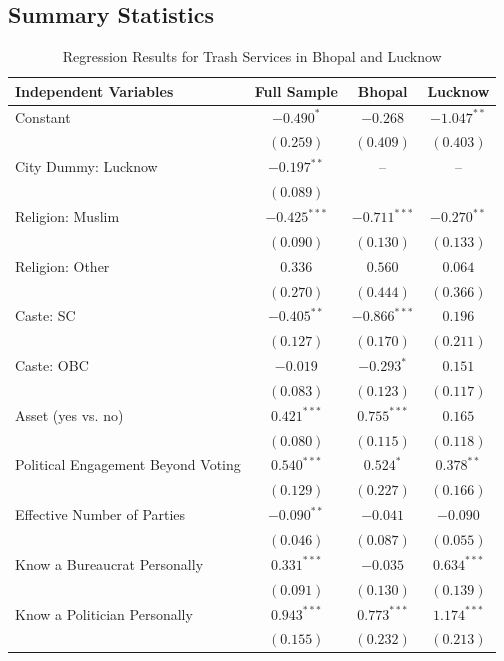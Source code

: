\subsection{Summary Statistics}

\begin{table}[htbp]
\centering
\caption{Regression Results for Trash Services in Bhopal and Lucknow}
\label{tab:trash_regression}
\small
\begin{tabular}{lccc}
\hline\hline
\textbf{Independent Variables} & \textbf{Full Sample} & \textbf{Bhopal} & \textbf{Lucknow} \\
\hline
Constant & $-0.490^{*}$ & $-0.268$ & $-1.047^{**}$ \\
 & $(0.259)$ & $(0.409)$ & $(0.403)$ \\
City Dummy: Lucknow & $-0.197^{**}$ & -- & -- \\
 & $(0.089)$ & & \\
Religion: Muslim & $-0.425^{***}$ & $-0.711^{***}$ & $-0.270^{**}$ \\
 & $(0.090)$ & $(0.130)$ & $(0.133)$ \\
Religion: Other & $0.336$ & $0.560$ & $0.064$ \\
 & $(0.270)$ & $(0.444)$ & $(0.366)$ \\
Caste: SC & $-0.405^{**}$ & $-0.866^{***}$ & $0.196$ \\
 & $(0.127)$ & $(0.170)$ & $(0.211)$ \\
Caste: OBC & $-0.019$ & $-0.293^{*}$ & $0.151$ \\
 & $(0.083)$ & $(0.123)$ & $(0.117)$ \\
Asset (yes vs. no) & $0.421^{***}$ & $0.755^{***}$ & $0.165$ \\
 & $(0.080)$ & $(0.115)$ & $(0.118)$ \\
Political Engagement Beyond Voting & $0.540^{***}$ & $0.524^{*}$ & $0.378^{**}$ \\
 & $(0.129)$ & $(0.227)$ & $(0.166)$ \\
Effective Number of Parties & $-0.090^{**}$ & $-0.041$ & $-0.090$ \\
 & $(0.046)$ & $(0.087)$ & $(0.055)$ \\
Know a Bureaucrat Personally & $0.331^{***}$ & $-0.035$ & $0.634^{***}$ \\
 & $(0.091)$ & $(0.130)$ & $(0.139)$ \\
Know a Politician Personally & $0.943^{***}$ & $0.773^{***}$ & $1.174^{***}$ \\
 & $(0.155)$ & $(0.232)$ & $(0.213)$ \\

\end{tabular}
\end{table}
